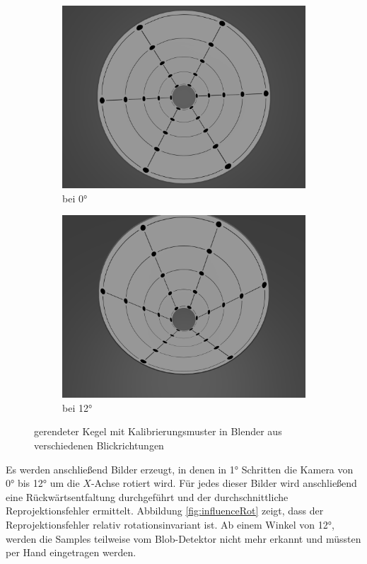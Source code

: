 \begin{figure}[!htb]
	\centering
	\begin{subfigure}{.5\textwidth}
		\centering
		\includegraphics[width=.9\textwidth]{images/blender0.png}
		\caption{bei 0°}
	\end{subfigure}%
	\begin{subfigure}{.5\textwidth}
		\centering
		\includegraphics[width=.9\textwidth]{images/blender12.png}
		\caption{bei 12°}
	\end{subfigure}
	\label{fig:blender}
	\caption{gerendeter Kegel mit Kalibrierungsmuster in Blender aus verschiedenen Blickrichtungen}
\end{figure}


Es werden anschließend Bilder erzeugt, in denen in 1° Schritten die Kamera von 0° bis 12° um die $X$-Achse rotiert wird. Für jedes dieser Bilder wird anschließend eine Rückwärtsentfaltung durchgeführt und der durchschnittliche Reprojektionsfehler ermittelt. Abbildung \ref{fig:influenceRot} zeigt, dass der Reprojektionsfehler relativ rotationsinvariant ist. Ab einem Winkel von  12°, werden die Samples teilweise vom Blob-Detektor nicht mehr erkannt und müssten per Hand eingetragen werden. 


